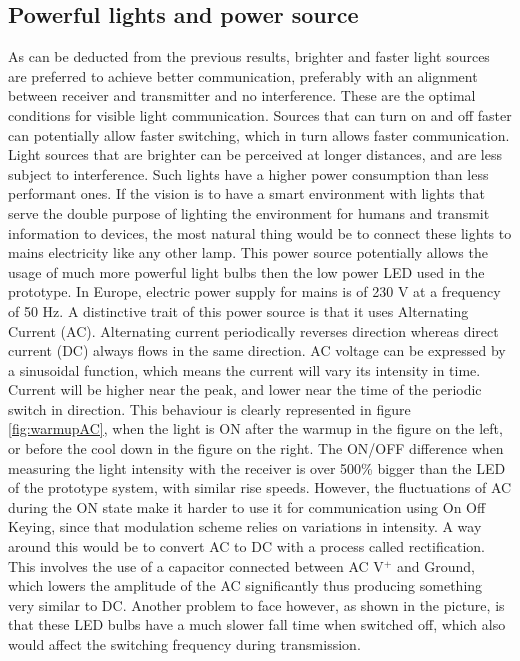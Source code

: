 \subsection{Powerful lights and power source}
\label{acphy}
As can be deducted from the previous results, brighter and faster light sources are preferred to achieve better communication, preferably with an alignment between receiver and transmitter and no interference.
These are the optimal conditions for visible light communication. 
Sources that can turn on and off faster can potentially allow faster switching, which in turn allows faster communication.
Light sources that are brighter can be perceived at longer distances, and are less subject to interference.
Such lights have a higher power consumption than less performant ones.
If the vision is to have a smart environment with lights that serve the double purpose of lighting the environment for humans and transmit information to devices, the most natural thing would be to connect these lights to mains electricity like any other lamp.
This power source potentially allows the usage of much more powerful light bulbs then the low power LED used in the prototype.
In Europe, electric power supply for mains is of 230 V at a frequency of 50 Hz.
A distinctive trait of this power source is that it uses Alternating Current (AC).
Alternating current periodically reverses direction whereas direct current (DC) always flows in the same direction.
AC voltage can be expressed by a sinusoidal function, which means the current will vary its intensity in time.
Current will be higher near the peak, and lower near the time of the periodic switch in direction. 
This behaviour is clearly represented in figure \ref{fig:warmupAC}, when the light is ON after the warmup in the figure on the left, or before the cool down in the figure on the right.
The ON/OFF difference when measuring the light intensity with the receiver is over 500\% bigger than the LED of the prototype system, with similar rise speeds.
However, the fluctuations of AC during the ON state make it harder to use it for communication using On Off Keying, since that modulation scheme relies on variations in intensity.
A way around this would be to convert AC to DC with a process called rectification.
This involves the use of a capacitor connected between AC V$^{+}$ and Ground,  which lowers the amplitude of the AC significantly thus producing something very similar to DC.
Another problem to face however, as shown in the picture, is that these LED bulbs have a much slower fall time when switched off, which also would affect the switching frequency during transmission.

